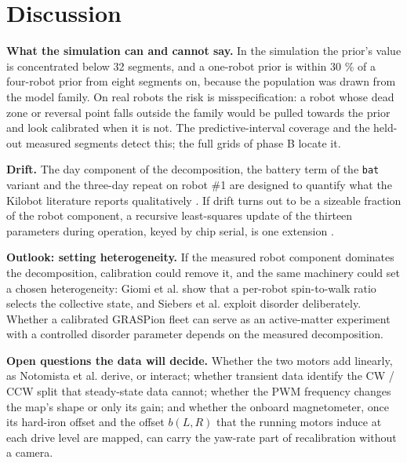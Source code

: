 \section{Discussion}\label{sec:discussion}


\textbf{What the simulation can and cannot say.} In the simulation the
prior's value is concentrated below 32 segments, and a one-robot prior
is within 30 \% of a four-robot prior from eight segments on, because
the population was drawn from the model family. On real robots the risk
is misspecification: a robot whose dead zone or reversal point falls
outside the family would be pulled towards the prior and look calibrated
when it is not. The predictive-interval coverage and the held-out
measured segments detect this; the full grids of phase B locate it.

\textbf{Drift.} The day component of the decomposition, the battery term
of the \texttt{bat} variant and the three-day repeat on robot \#1 are
designed to quantify what the Kilobot literature reports qualitatively
\cite{raoufi2023individuality, rubenstein2014kilobot}. If drift turns
out to be a sizeable fraction of the robot component, a recursive
least-squares update of the thirteen parameters during operation,
keyed by chip serial, is one extension
\cite{martinelli2007selfcalibration, roy1999selfcalibration}.

\textbf{Outlook: setting heterogeneity.} If the measured robot
component dominates the decomposition, calibration could remove it, and
the same machinery could set a chosen heterogeneity: Giomi et al.
\cite{giomi2013bristlebots} show that a per-robot spin-to-walk ratio
selects the collective state, and Siebers et al.
\cite{siebers2023disorder} exploit disorder deliberately. Whether a
calibrated GRASPion fleet can serve as an active-matter experiment with
a controlled disorder parameter depends on the measured decomposition.

\textbf{Open questions the data will decide.} Whether the two motors add
linearly, as Notomista et al. \cite{notomista2019brushbot} derive, or
interact; whether transient data identify the CW / CCW split that
steady-state data cannot; whether the PWM frequency changes the map's
shape or only its gain; and whether the onboard magnetometer, once its
hard-iron offset \cite{vasconcelos2011magnetometer} and the offset
\(b(L,R)\) that the running motors induce at each drive level are
mapped, can carry the yaw-rate part
of recalibration without a camera.
